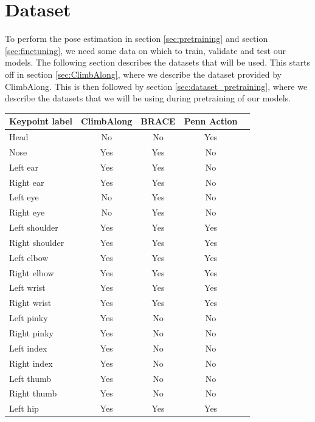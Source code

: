 \documentclass[./main.tex]{subfiles}
\begin{document}
\section{Dataset}
\label{sec:dataset}
To perform the pose estimation in section \ref{sec:pretraining} and section \ref{sec:finetuning}, we need some data on which to train, validate and test our models. The following section describes the datasets that will be used. This starts off in section \ref{sec:ClimbAlong}, where we describe the dataset provided by ClimbAlong. This is then followed by section \ref{sec:dataset_pretraining}, where we describe the datasets that we will be using during pretraining of our models.

\begin{table}[htbp]
    \begin{tabular}{|l|c|c|c|c|}
        \hline
        \textbf{Keypoint label} & \textbf{ClimbAlong} & \textbf{BRACE} & \textbf{Penn Action} \\ \hline
        Head & No & No & Yes \\ \hline
        Nose & Yes & Yes & No \\ \hline
        Left ear & Yes & Yes & No \\ \hline
        Right ear & Yes & Yes & No \\ \hline
        Left eye & No & Yes & No \\ \hline
        Right eye & No & Yes & No \\ \hline
        Left shoulder & Yes & Yes & Yes \\ \hline
        Right shoulder & Yes & Yes & Yes \\ \hline
        Left elbow & Yes & Yes & Yes \\ \hline
        Right elbow & Yes & Yes & Yes \\ \hline
        Left wrist & Yes & Yes & Yes \\ \hline
        Right wrist & Yes & Yes & Yes \\ \hline
        Left pinky & Yes & No & No \\ \hline
        Right pinky & Yes & No & No \\ \hline
        Left index & Yes & No & No \\ \hline
        Right index & Yes & No & No \\ \hline
        Left thumb & Yes & No & No \\ \hline
        Right thumb & Yes & No & No \\ \hline
        Left hip & Yes & Yes & Yes \\ \hline

\end{tabular}
\end{table}
\end{document}
